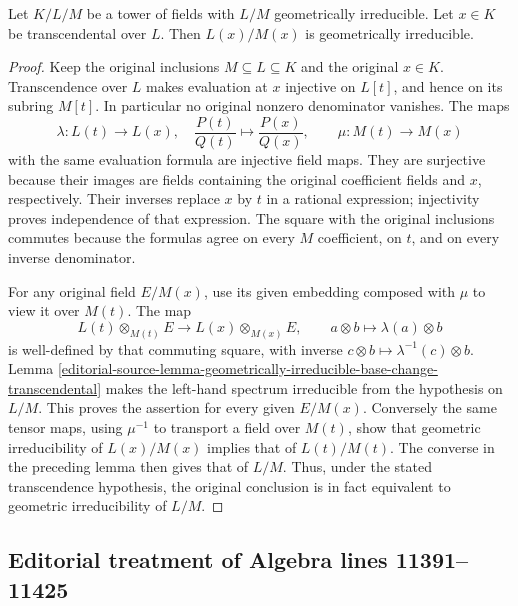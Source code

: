 \begin{lemma}
\label{editorial-source-lemma-geometrically-irreducible-add-transcendental}
Let $K/L/M$ be a tower of fields with $L/M$ geometrically irreducible.
Let $x \in K$ be transcendental over $L$. Then $L(x)/M(x)$ is geometrically
irreducible.
\end{lemma}

\begin{proof}
Keep the original inclusions
$M\subseteq L\subseteq K$ and
the original $x\in K$.
Transcendence over $L$ makes
evaluation at $x$ injective on
$L[t]$, and hence on its subring
$M[t]$. In particular no original
nonzero denominator vanishes.
The maps
$$
\lambda:L(t)\longrightarrow L(x),\quad
\frac{P(t)}{Q(t)}\longmapsto\frac{P(x)}{Q(x)},
\qquad
\mu:M(t)\longrightarrow M(x)
$$
with the same evaluation formula
are injective field maps. They
are surjective because their
images are fields containing the
original coefficient fields and
$x$, respectively. Their inverses
replace $x$ by $t$ in a rational
expression; injectivity proves
independence of that expression.
The square with the original
inclusions commutes because the
formulas agree on every $M$
coefficient, on $t$, and on
every inverse denominator.

For any original field $E/M(x)$,
use its given embedding composed
with $\mu$ to view it over $M(t)$.
The map
$$
L(t)\otimes_{M(t)}E\longrightarrow L(x)\otimes_{M(x)}E,
\qquad a\otimes b\longmapsto\lambda(a)\otimes b
$$
is well-defined by that commuting
square, with inverse
$c\otimes b\mapsto\lambda^{-1}(c)\otimes b$.
Lemma
\ref{editorial-source-lemma-geometrically-irreducible-base-change-transcendental}
makes the left-hand spectrum
irreducible from the hypothesis
on $L/M$. This proves the assertion
for every given $E/M(x)$.
Conversely the same tensor maps,
using $\mu^{-1}$ to transport a
field over $M(t)$, show that
geometric irreducibility of
$L(x)/M(x)$ implies that of
$L(t)/M(t)$. The converse in the
preceding lemma then gives that
of $L/M$. Thus, under the stated
transcendence hypothesis, the
original conclusion is in fact
equivalent to geometric
irreducibility of $L/M$.
\end{proof}


\subsection{Editorial treatment of Algebra lines 11391--11425}

\hypertarget{algebra-context-146}{}


